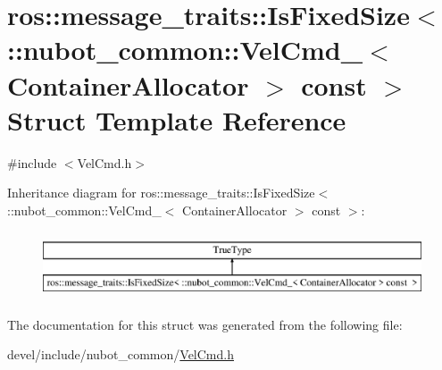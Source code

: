 \hypertarget{structros_1_1message__traits_1_1IsFixedSize_3_01_1_1nubot__common_1_1VelCmd___3_01ContainerAllocator_01_4_01const_01_01_4}{\section{ros\-:\-:message\-\_\-traits\-:\-:Is\-Fixed\-Size$<$ \-:\-:nubot\-\_\-common\-:\-:Vel\-Cmd\-\_\-$<$ Container\-Allocator $>$ const $>$ Struct Template Reference}
\label{structros_1_1message__traits_1_1IsFixedSize_3_01_1_1nubot__common_1_1VelCmd___3_01ContainerAllocator_01_4_01const_01_01_4}
}


{\ttfamily \#include $<$Vel\-Cmd.\-h$>$}

Inheritance diagram for ros\-:\-:message\-\_\-traits\-:\-:Is\-Fixed\-Size$<$ \-:\-:nubot\-\_\-common\-:\-:Vel\-Cmd\-\_\-$<$ Container\-Allocator $>$ const $>$\-:\begin{figure}[H]
\begin{center}
\leavevmode
\includegraphics[height=2.000000cm]{structros_1_1message__traits_1_1IsFixedSize_3_01_1_1nubot__common_1_1VelCmd___3_01ContainerAllocator_01_4_01const_01_01_4}
\end{center}
\end{figure}


The documentation for this struct was generated from the following file\-:\begin{DoxyCompactItemize}
\item 
devel/include/nubot\-\_\-common/\hyperlink{VelCmd_8h}{Vel\-Cmd.\-h}\end{DoxyCompactItemize}
